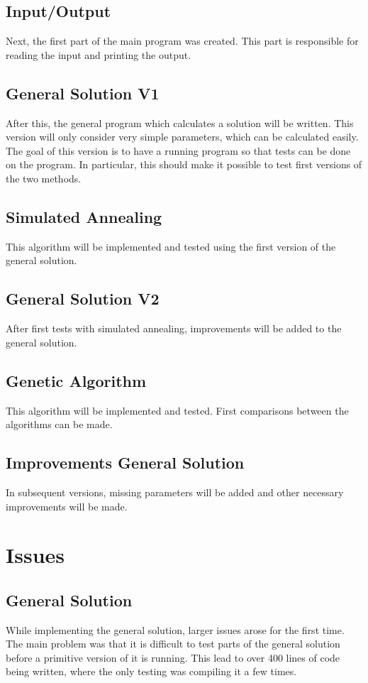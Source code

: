 \documentclass[10pt]{report}
\begin{document}
\section{Input/Output}
Next, the first part of the main program was created. This part is responsible for reading the input and printing the output.

\section{General Solution V1}
After this, the general program which calculates a solution will be written. This version will only consider very simple parameters, which can be calculated easily. The goal of this version is to have a running program so that tests can be done on the program. In particular, this should make it possible to test first versions of the two methods.

\section{Simulated Annealing}
This algorithm will be implemented and tested using the first version of the general solution.

\section{General Solution V2}
After first tests with simulated annealing, improvements will be added to the general solution.

\section{Genetic Algorithm}
This algorithm will be implemented and tested. First comparisons between the algorithms can be made.

\section{Improvements General Solution}
In subsequent versions, missing parameters will be added and other necessary improvements will be made.

\chapter{Issues}
\section{General Solution}
While implementing the general solution, larger issues arose for the first time. The main problem was that it is difficult to test parts of the general solution before a primitive version of it is running. This lead to over 400 lines of code being written, where the only testing was compiling it a few times. 
\end{document}
